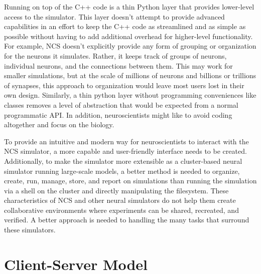 Running on top of the C++ code is a thin Python layer that provides lower-level access to the simulator. This layer doesn't attempt to provide advanced capabilities in an effort to keep the C++ code as streamlined and as simple as possible without having to add additional overhead for higher-level functionality. For example, NCS doesn't explicitly provide any form of grouping or organization for the neurons it simulates. Rather, it keeps track of groups of neurons, individual neurons, and the connections between them. This may work for smaller simulations, but at the scale of millions of neurons and billions or trillions of synapses, this approach to organization would leave most users lost in their own design. Similarly, a thin python layer without programming conveniences like classes removes a level of abstraction that would be expected from a normal programmatic API. In addition, neuroscientists might like to avoid coding altogether and focus on the biology.

To provide an intuitive and modern way for neuroscientists to interact with the NCS simulator, a more capable and user-friendly interface needs to be created. Additionally, to make the simulator more extensible as a cluster-based neural simulator running large-scale models, a better method is needed to organize, create, run, manage, store, and report on simulations than running the simulation via a shell on the cluster and directly manipulating the filesystem. These characteristics of NCS and other neural simulators do not help them create collaborative environments where experiments can be shared, recreated, and verified. A better approach is needed to handling the many tasks that surround these simulators.

\section{Client-Server Model}

